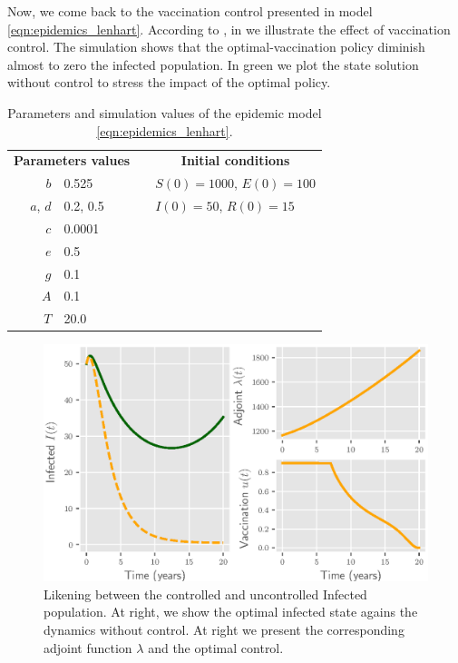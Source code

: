 Now, we come back to the vaccination control presented in model
\eqref{eqn:epidemics_lenhart}. According to ,
in  we illustrate the effect of vaccination 
control. The simulation shows that the optimal-vaccination policy diminish
almost to zero the infected population. In green we plot the state 
solution without control to stress the impact of the optimal policy.
\begin{table}[H]
  \begin{center}
    \begin{tabular}{rlll}
      \toprule
      \multicolumn{2}{c}{
            \textbf{Parameters values}
         }
        && \multicolumn{1}{c}{
          \textbf{Initial conditions}
        }
        \\
        \cmidrule{1-2}
        \cmidrule{4-4}
        $b$
          & \num{0.525}
          &&
          $S(0) = \num{1000}$, $E(0) = \num{100}$
        \\
        $a$, $d$ 
          & \num{0.2}, \num{0.5}
          &&
          $I(0) = \num{50}$, $R(0) = \num{15}$
        \\
        $c$
          & \num{0.0001}
        \\
        $e$
          & \num{0.5}
        \\
        $g$
          & \num{0.1}
        \\
        $A$
          & \num{0.1}
        \\
        $T$
          & \num{20.0}
        \\
      \bottomrule
    \end{tabular}
    \caption{Parameters and simulation values of the epidemic model
      \eqref{eqn:epidemics_lenhart}.}
    \label{tbl:epidemics_lenhart}
  \end{center}
\end{table}

\begin{figure}[H]
\centering
	\includegraphics{./Figures/epidemics_lenhart_lab7}
	\caption{Likening between the controlled and uncontrolled Infected 
	 population.  At right, we show the optimal infected state agains the 
	 dynamics without 
	 control. At right we present the corresponding adjoint function $\lambda$ 
	 and the optimal control.}
\label{fig:epidemicslenhartlab7}
\end{figure}
